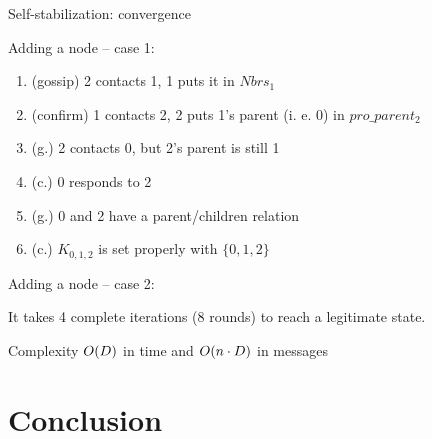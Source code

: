 \documentclass[10pt, compress]{beamer}
\begin{document}
\begin{frame}{Self-stabilization: convergence}

\begin{block}{Adding a node -- case 1: \qquad
{}
}
\begin{enumerate}
\item (gossip) 2 contacts 1, 1 puts it in $Nbrs_1$
\item (confirm) 1 contacts 2, 2 puts 1's parent (i. e. 0) in $pro\_parent_2$
\item (g.) 2 contacts 0, but 2's parent is still 1
\item (c.) 0 responds to 2
\item (g.) 0 and 2 have a parent/children relation
\item (c.) $K_{0,1,2}$ is set properly with $\{0, 1, 2\}$
\end{enumerate}
\end{block}

\begin{block}{Adding a node -- case 2: \qquad 
{}
}
It takes 4 complete iterations (8 rounds) to reach a legitimate state.
\end{block}

\begin{block}{Complexity}
$\mathnormal{O(D)}$ in time and $\mathnormal{O(n \cdot D)}$ in messages
\end{block}
\end{frame}


\section{Conclusion}

\end{document}
